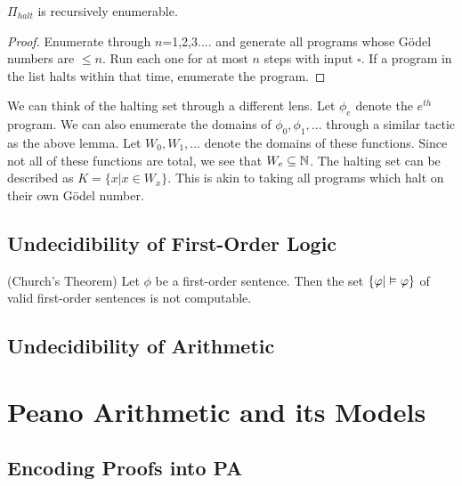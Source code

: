 \documentclass[main.tex]{subfiles}
\begin{document}
\begin{lemma}
 $\Pi_{halt}$ is recursively enumerable.
\end{lemma}

\begin{proof}
 Enumerate through $n$=1,2,3.... and generate all programs whose G\"{o}del numbers are $\leq n$. Run each one for at most $n$ steps with input $\square$. If a program in the list halts within that time,
 enumerate the program.
\end{proof}

 We can think of the halting set through a different lens. Let $\phi_e$ denote the $e^{th}$ program. We can also enumerate the domains of $\phi_0,\phi_1,...$ through a similar tactic as the above lemma.
 Let $W_0,W_1,...$ denote the domains of these functions. Since not all of these functions are total, we see that $W_e \subseteq \mathbb{N}$. The halting set can be described as $K = \{x \vert x \in W_x\}$. This is akin to taking all programs which halt on their own G\"{o}del number.
\subsection{Undecidibility of First-Order Logic}

\begin{theorem}
 (Church's Theorem)
 Let $\phi$ be a first-order sentence. Then the set $\{\varphi \vert \vDash \varphi\}$ of valid first-order sentences is not computable.
\end{theorem}

\subsection{Undecidibility of Arithmetic}


\newpage
\section{Peano Arithmetic and its Models}


\subsection{Encoding Proofs into PA}
\end{document}
